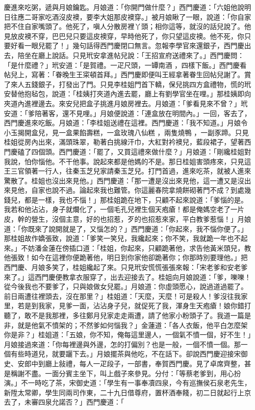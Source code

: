 \begin{showcontents}{}
慶進來吃粥，遞與月娘鑰匙。月娘道：「你開門做什麼？」西門慶道：「六姐他說明日往應二哥家吃酒沒皮襖，要李大姐那皮襖穿。」被月娘瞅了一眼，說道：「你自家把不住自家嘴頭了。他死了，嗔人分散房裡丫頭；相你這等，就沒的話兒說了。他見放皮襖不穿，巴巴兒只要這皮襖穿，早時他死了，你只望這皮襖。他不死，你只要好看一眼兒罷了！」幾句話得西門慶閉口無言。忽報李學官來還銀子，西門慶出去，陪坐在廳上說話。只見玳安拿進帖兒說：「王招宣府送禮來了。」西門慶問：「是什麼禮？」玳安道：「是賀禮。一疋尺頭，一罈南酒 ，四樣下飯。」西門慶看帖兒上，寫著：「眷晚生王寀頓首拜。」西門慶即便叫王經拿著眷生回帖兒謝了。賞了來人五錢銀子，打發出了門。只見李桂姐門首下轎，保兒挑四方盒禮物，慌的玳安替他抱毡包，說道：「桂姨打夾道內進去罷，廳上有劉學官坐在哩。」那桂姨即向夾道內進裡邊去。來安兒把盒子挑進月娘房裡去。月娘道：「爹看見來不曾？」玳安道：「爹陪著客，還不見哩。」月娘便說道：「連盒放在明間內。」一回，客去了，西門慶進來吃飯。月娘道：「李桂姐送禮在這裡。西門慶道：「我不知道。」月娘令小玉揭開盒兒，見一盒果餡壽糕，一盒玫瑰八仙糕 ，兩隻燒鴨 ，一副豕蹄。只見桂姐從房內出來，滿頭珠翠，勒著白挑線汗巾，大紅對衿襖兒，藍段裙子，望著西門慶磕了四個頭。西門慶道：「罷了，又買這禮來做什麼？」月娘道：「剛纔桂姐對我說，怕你惱他。不干他事。說起來都是他媽的不是。那日桂姐害頭疼來，只見這王三官領著一行人，往秦玉芝兒家請秦玉芝兒。打門首過，進來吃茶，就被人進來驚散了。桂姐也沒出來見他。」西門慶道：「那一遭是沒出來見他，這一遭又是沒出來見他，自家也說不過。論起來我也難管。你這麗春院拿燒餅砌著門不成？到處幾錢兒，都是一樣，我也不惱！」那桂姐跪在地下，只顧不起來說道：「爹惱的是。我若和他沾沾，身子就爛化了，一個毛孔兒裡生個天疱瘡！都是俺媽空老了一片皮，幹的營生，沒個主意，好的也招惹，歹的也招惹來家，平白教爹惹惱！」月娘道：「你既來了說開就是了，又惱怎的？」西門慶道：「你起來，我不惱你便了。」那桂姐故作嬌張致，說道：「爹笑一笑兒，我纔起來；你不笑，我就跪一年也不起來。」不妨潘金蓮在傍插口道：「桂姐，你起來，只顧跪著他，求告他黃米頭兒，教他張致！如今在這裡你便跪著他，明日到你家他卻跪著你；你那時別要理他。」把西門慶、月娘多笑了，桂姐纔起了來。只見玳安慌慌張張來報：「宋老爹和安老爹來了。」這西門慶便教拿衣服穿了，出去迎接去了。桂姐向月娘說道：「爹，嚛嚛！從今後我也不要爹了，只與娘做女兒罷。」月娘道：你虛頭愿心，說過道過罷了。前日兩遭往裡頭去，沒在那里？」桂姐道：「天麼，天麼！可是殺人！爹沒往我家里，若是到我家，見爹一面，沾沾身子兒，就促死了我，渾身生天疱瘡！娘你錯打聽了，敢不是我那裡，多往鄭月兒家走走兩遭，請了他家小粉頭子了。我道一篇是非，就是他氣不憤架的；不然爹如何惱我？」金蓮道：「各人衣飯，他平白怎麼架你是非？」桂姐道：「五娘，你不知，俺每這里邊人，一個氣不憤一個，好不生！」月娘接過來道：「你每裡邊與外邊，怎的打偏別？也是一般，一個不憤一個。那一個有些時道兒，就要躧下去。」月娘擺茶與他吃，不在話下。卻說西門慶迎接宋御史、安郎中到廳上敍禮，每人一疋段子，一部書，奉賀西門慶。見了卓席齊整，甚是稱謝不盡。一面分賓主坐下，叫上戲子來參見。分付：「等蔡老爹到，用心扮演。」不一時吃了茶，宋御史道：「學生有一事奉凟四泉，今有巡撫侯石泉老先生，新陞太常卿，學生同兩司作東，二十九日借尊府，置杯酒奉餞，初二日就起行上京去了，未審四泉允諾否？」西門慶道：「
\end{showcontents}

